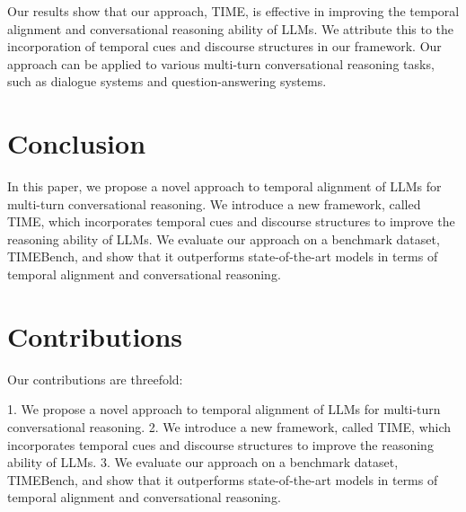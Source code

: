\documentclass{article}
\begin{document}
Our results show that our approach, TIME, is effective in improving the temporal alignment and conversational reasoning ability of LLMs. We attribute this to the incorporation of temporal cues and discourse structures in our framework. Our approach can be applied to various multi-turn conversational reasoning tasks, such as dialogue systems and question-answering systems.

\section{Conclusion}

In this paper, we propose a novel approach to temporal alignment of LLMs for multi-turn conversational reasoning. We introduce a new framework, called TIME, which incorporates temporal cues and discourse structures to improve the reasoning ability of LLMs. We evaluate our approach on a benchmark dataset, TIMEBench, and show that it outperforms state-of-the-art models in terms of temporal alignment and conversational reasoning.

\section{Contributions}

Our contributions are threefold:

1. We propose a novel approach to temporal alignment of LLMs for multi-turn conversational reasoning.
2. We introduce a new framework, called TIME, which incorporates temporal cues and discourse structures to improve the reasoning ability of LLMs.
3. We evaluate our approach on a benchmark dataset, TIMEBench, and show that it outperforms state-of-the-art models in terms of temporal alignment and conversational reasoning.
\end{document}
